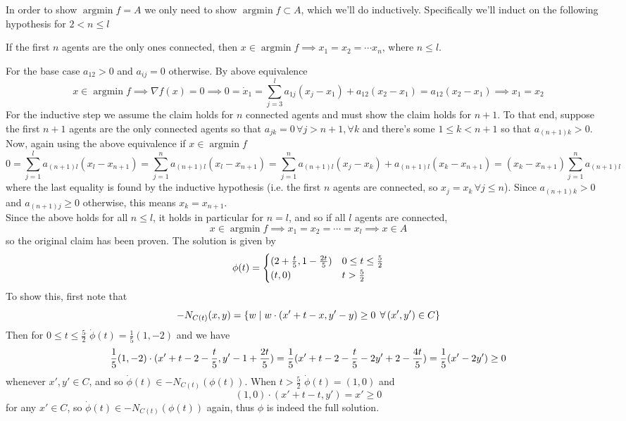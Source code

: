 \documentclass{article}
\newenvironment{ex}[1]
  {\renewcommand\theexercise{#1}\exercise}
  {\endexercise}
\DeclareMathOperator*{\argmin}{arg min}
\begin{document}
\begin{ex}{8.20}
  In order to show $\argmin f = A$ we only need to show $\argmin f \subset A$, which we'll do inductively. Specifically we'll induct on the following hypothesis for $2 < n \le l$ \, \\


  \begin{claim}
    If the first $n$ agents are the only ones connected, then $x \in \argmin f \implies x_1 = x_2 = \cdots x_n$, where $n \le l$.
  \end{claim}


  For the base case $a_{12} > 0$ and $a_{ij} = 0$ otherwise. By above equivalence
  $$
  x \in \argmin f \implies \nabla f(x) = 0 \implies 0 = \dot{x}_1 = \sum_{j=3}^l a_{1j} (x_j - x_1) + a_{12}( x_2 - x_1 ) = a_{12} ( x_2 - x_1 ) \implies x_1 = x_2
  $$
  For the inductive step we assume the claim holds for $n$ connected agents and must show the claim holds for $n+1$. To that end, suppose the first $n+1$ agents are the only connected agents so that $a_{jk} = 0 \, \forall j > n+1, \forall k$ and there's some $1 \le k < n+1$ so that $a_{(n+1)k} > 0$. Now, again using the above equivalence if $x \in \argmin f$
  $$
  0 = \sum_{j=1}^l a_{(n+1)l} (x_l - x_{n+1}) = \sum_{j=1}^n a_{(n+1)l} (x_l - x_{n+1}) = \sum_{j=1}^n a_{(n+1)l} (x_j - x_k) + a_{(n+1)l} (x_k - x_{n+1}) = (x_k - x_{n+1}) \sum_{j=1}^n a_{(n+1)l}
  $$
  where the last equality is found by the inductive hypothesis (i.e. the first $n$ agents are connected, so $x_j = x_k \, \forall j \le n$). Since $a_{(n+1)k} > 0$ and $a_{(n+1)j} \ge 0$ otherwise, this means $x_k = x_{n+1}$. \, \\

  Since the above holds for all $n \le l$, it holds in particular for $n = l$, and so if all $l$ agents are connected,
  $$
  x \in \argmin f \implies x_1 = x_2 = \cdots = x_l \implies x \in A
  $$
  so the original claim has been proven.
\end{ex} %
\begin{ex}{8.26} %
  The solution is given by
  $$
  \phi(t) = \begin{cases}
    ( 2 + \frac{t}{5}, 1 - \frac{2t}{5} ) & 0 \le t \le \frac{5}{2} \\
    (t, 0) & t > \frac{5}{2}
  \end{cases}
  $$
  To show this, first note that
  $$
  -N_{C(t)}(x, y) = \braces{ w \mid w \cdot (x' + t - x, y' - y) \ge 0 \, \forall (x', y') \in C }
  $$
  Then for $0 \le t \le \frac{5}{2}$ $\dot{\phi}(t) = \frac{1}{5}(1, -2)$ and we have
  $$
  \frac{1}{5}(1, -2) \cdot (x' + t - 2 - \frac{t}{5}, y' - 1 + \frac{2t}{5}) = \frac{1}{5}( x' + t -2 - \frac{t}{5} - 2y' + 2 - \frac{4t}{5} ) = \frac{1}{5}(x' - 2y') \ge 0
  $$
  whenever $x', y' \in C$, and so $\dot{\phi}(t) \in - N_{C(t)}(\phi(t))$. When $t > \frac{5}{2}$ $\dot{\phi}(t) = (1, 0)$ and
  $$
  (1, 0) \cdot (x' + t - t, y') = x' \ge 0
  $$
  for any $x' \in C$, so $\dot{\phi}(t) \in -N_{C(t)}(\phi(t))$ again, thus $\phi$ is indeed the full solution.
\end{ex} %
\end{document}
